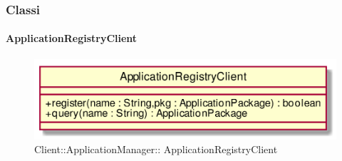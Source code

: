 \subsubsection{Classi}
\hypertarget{ ApplicationRegistryClient_label}{\paragraph{ ApplicationRegistryClient}}
\begin{figure}[h]
	\centering
	\includegraphics[width=\textwidth,height=\textheight,keepaspectratio]{images/Class_ApplicationRegistryClient.png}
	\caption{Client::ApplicationManager:: ApplicationRegistryClient}
\end{figure}
